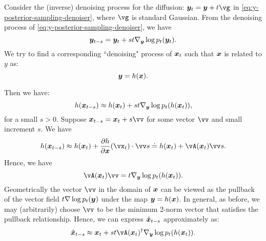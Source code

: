 \documentclass[../../book-main.tex]{subfiles}
\begin{document}
Consider the (inverse) denoising process for the diffusion: $\y_t = \y + t\vg $ in \eqref{eq:y-posterior-sampling-denoiser}, where $\vg$ is standard Gaussian. From the denoising process of \eqref{eq:y-posterior-sampling-denoiser}, we have
\begin{equation}
    \bm{y}_{t-s} =  \bm{y}_t + st \nabla_{\bm{y}} \log p_t(\bm{y}_t).
\end{equation}
We try to find a corresponding ``denoising" process of $\bm{x}_t$ such that $\bm{x}$ is related to $y$ as:
\begin{equation}
    \bm{y} =  h(\bm{x}).
\end{equation}

Then we have:
\begin{equation}
    h(\bm{x}_{t-s}) \approx  h(\bm{x}_t) + st \nabla_{\bm{y}} \log p_t(h(\bm{x}_t)),
\end{equation}
for a small $s >0$. 
Suppose $\x_{t-s} = \x_t + s \vv$ for some vector $\vv$ and small increment $s$. We have
\begin{equation}
    h(\x_{t-s}) \approx h(\x_t) + \frac{\partial h}{\partial \x}(\vx_{t}) \cdot \vv s \doteq h(\x_t) + \vA(\x_t) \vv s. 
\end{equation}
Hence, we have
\begin{equation}
    \vA(\x_t) \vv = t \nabla_{\y} \log p_t(h(\x_t)).
    \label{eqn:pushforward}
\end{equation}
Geometrically the vector $\vv$ in the domain of $\bm{x}$ can be viewed as the pullback of the vector field $t \nabla \log p_t(\bm{y})$ under the map $\bm{y} = h(\bm{x})$. In general, as before, we may (arbitrarily) choose $\vv$ to be the minimum 2-norm vector that satisfies the pullback relationship. Hence, we can express  $\hat{\bm{x}}_{t-s}$ approximately as:
\begin{equation}
    \hat{\x}_{t-s} \approx \x_t + st\vA(\x_t)^\dagger \nabla_{\y} \log p_t(h(\x_t)). 
\label{eqn:pullback-denoise}
\end{equation}
\end{document}
